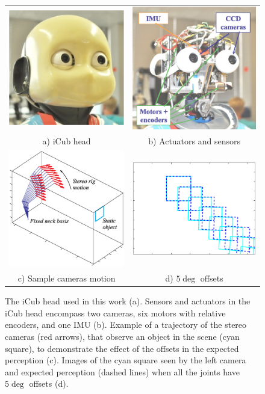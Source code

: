 \begin{figure}
\centering
\begin{tabular}{cc}
  \includegraphics[width=0.4\columnwidth]{images/intro/chica_head} & \includegraphics[width=0.4\columnwidth]{images/intro/chica_head_devices}\\
  a) iCub head & b) Actuators and sensors \\
\includegraphics[width=0.4\columnwidth]{images/intro/cam_sim_err_localiz_v2} & \includegraphics[width=0.4\columnwidth]{images/intro/cam_sim_err_5deg}\\
  c) Sample cameras motion & d) $5\deg$ offsets
\end{tabular}
\caption{The iCub head used in this work (a). Sensors and actuators in the iCub head encompass two cameras, six motors with relative encoders, and one IMU (b). Example of a trajectory of the stereo cameras (red arrows), that observe an object in the scene (cyan square), to demonstrate the effect of the offsets in the expected perception (c). Images of the cyan square seen by the left camera and expected perception (dashed lines) when all the joints have $5\deg$ offsets (d).}
\label{fig:intro_figure}
\end{figure}

